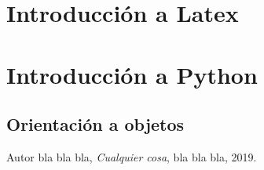 \documentclass{book}
\begin{document}
	
	
	
	\chapter{Introducción a Latex}
	\chapter{Introducción a Python}
	\section*{Orientación a objetos}
	
	\begin{thebibliography}{9}
		Autor bla bla bla,
		\textit{Cualquier cosa},
		bla bla bla, 2019.
	\end{thebibliography}
	
	
\end{document}
